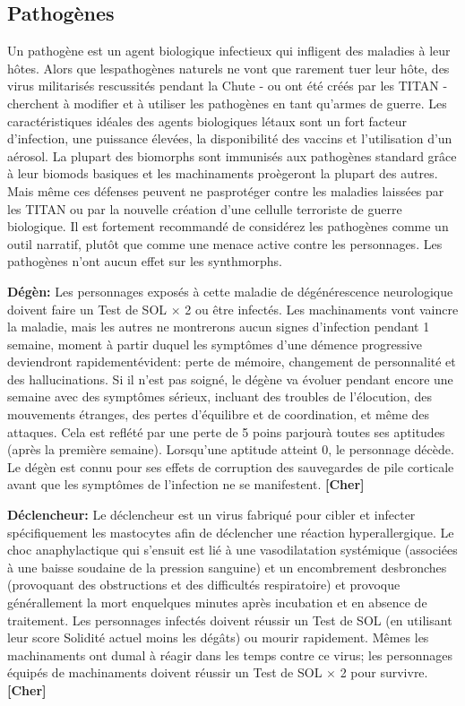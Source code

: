 \subsection{Pathogènes} \label{sec:pathogens} 

Un pathogène est un agent biologique infectieux qui infligent des maladies à leur hôtes. Alors que lespathogènes naturels ne vont que rarement tuer leur hôte, des virus militarisés rescussités pendant la Chute - ou ont été créés par les TITAN - cherchent à modifier et à utiliser les pathogènes en tant qu'armes de guerre. Les caractéristiques idéales des agents biologiques létaux sont un fort facteur d'infection, une puissance élevées, la disponibilité des vaccins et l'utilisation d'un aérosol. La plupart des biomorphs sont immunisés aux pathogènes standard grâce à leur biomods basiques et les machinaments proègeront la plupart des autres. Mais même ces défenses peuvent ne pasprotéger contre les maladies laissées par les TITAN ou par la nouvelle création d'une cellulle terroriste de guerre biologique. Il est fortement recommandé de considérez les pathogènes comme un outil narratif, plutôt que comme une menace active contre les personnages. Les pathogènes n'ont aucun effet sur les synthmorphs. 

\textbf{Dégèn:} Les personnages exposés à cette maladie de dégénérescence neurologique doivent faire un Test de SOL $\times$ 2 ou être infectés. Les machinaments vont vaincre la maladie, mais les autres ne montrerons aucun signes d'infection pendant 1 semaine, moment à partir duquel les symptômes d'une démence progressive deviendront rapidementévident: perte de mémoire, changement de personnalité et des hallucinations. Si il n'est pas soigné, le dégène va évoluer pendant encore une semaine avec des symptômes sérieux, incluant des troubles de l'élocution, des mouvements étranges, des pertes d'équilibre et de coordination, et même des attaques. Cela est reflété par une perte de 5 poins parjourà toutes ses aptitudes (après la première semaine). Lorsqu'une aptitude atteint 0, le personnage décède. Le dégèn est connu pour ses effets de corruption des sauvegardes de pile corticale avant que les symptômes de l'infection ne se manifestent. \textbf{[Cher]} 

\textbf{Déclencheur:} Le déclencheur est un virus fabriqué pour cibler et infecter spécifiquement les mastocytes afin de déclencher une réaction hyperallergique. Le choc anaphylactique qui s'ensuit est lié à une vasodilatation systémique (associées à une baisse soudaine de la pression sanguine) et un encombrement desbronches (provoquant des obstructions et des difficultés respiratoire) et provoque générallement la mort enquelques minutes après incubation et en absence de traitement. Les personnages infectés doivent réussir un Test de SOL (en utilisant leur score Solidité actuel moins les dégâts) ou mourir rapidement. Mêmes les machinaments ont dumal à réagir dans les temps contre ce virus; les personnages équipés de machinaments doivent réussir un Test de SOL $\times$ 2 pour survivre. \textbf{[Cher]} 




